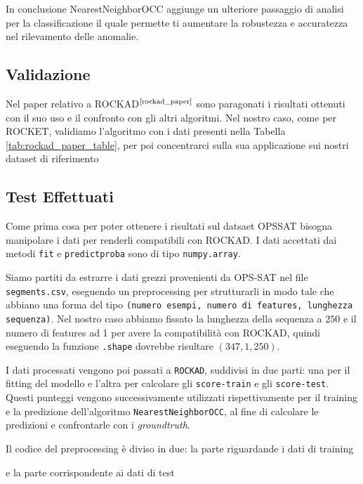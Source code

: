 In conclusione NearestNeighborOCC aggiunge un ulteriore passaggio di analisi per la classificazione il quale permette ti aumentare la robustezza e accuratezza nel rilevamento delle anomalie.
\subsection{Validazione}
Nel paper relativo a ROCKAD$^{\text{\cite{rockad_paper}}}$ sono paragonati i risultati ottenuti con il suo uso e il confronto con gli altri algoritmi. Nel nostro caso, come per  ROCKET, validiamo l'algoritmo con i dati presenti nella Tabella \ref{tab:rockad_paper_table}, per poi concentrarci sulla sua applicazione sui nostri dataset di riferimento



\subsection{Test Effettuati}
Come prima cosa per poter ottenere i risultati sul datsaet OPS\textunderscore SAT bisogna manipolare i dati per renderli compatibili con ROCKAD.
I dati accettati dai metodi \texttt{fit} e \texttt{predict\textunderscore proba} sono di tipo \texttt{numpy.array}.

Siamo partiti da estrarre i dati grezzi provenienti da OPS-SAT nel file \texttt{segments.csv}, eseguendo un preprocessing per strutturarli in modo tale che abbiano una forma del tipo  \texttt{(numero esempi, numero di features, lunghezza sequenza)}. Nel nostro caso abbiamo fissato la lunghezza della sequenza a $250$ e il numero di features ad 1 per avere la compatibilità con ROCKAD, quindi eseguendo la funzione \texttt{.shape} dovrebbe risultare $(347, 1, 250)$.

I dati processati vengono poi passati a \texttt{ROCKAD}, suddivisi in due parti: una per il fitting del modello e l'altra per calcolare gli \texttt{score-train} e gli \texttt{score-test}. Questi punteggi vengono successivamente utilizzati rispettivamente per il training e la predizione dell'algoritmo \texttt{NearestNeighborOCC}, al fine di calcolare le predizioni e confrontarle con i \textit{ground\textunderscore truth}.


Il codice del preprocessing è diviso in due: la parte riguardande i dati di training

e la parte corrispondente ai dati di test

